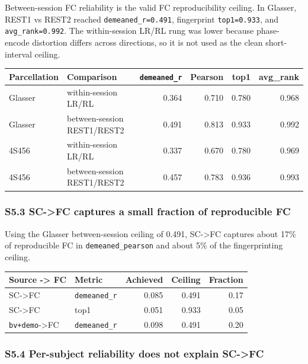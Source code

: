 Between-session FC reliability is the valid FC reproducibility ceiling. In Glasser, REST1 vs REST2 reached \texttt{demeaned\_r=0.491}, fingerprint \texttt{top1=0.933}, and \texttt{avg\_rank=0.992}. The within-session LR/RL rung was lower because phase-encode distortion differs across directions, so it is not used as the clean short-interval ceiling.

{\def\LTcaptype{none} %
\begin{longtable}[]{@{}llrrrr@{}}
\toprule\noalign{}
Parcellation & Comparison & \texttt{demeaned\_r} & Pearson & top1 & avg\_rank \\
\midrule\noalign{}
\endhead
\bottomrule\noalign{}
\endlastfoot
Glasser & within-session LR/RL & 0.364 & 0.710 & 0.780 & 0.968 \\
Glasser & between-session REST1/REST2 & 0.491 & 0.813 & 0.933 & 0.992 \\
4S456 & within-session LR/RL & 0.337 & 0.670 & 0.780 & 0.969 \\
4S456 & between-session REST1/REST2 & 0.457 & 0.783 & 0.936 & 0.993 \\
\end{longtable}
}

\subsubsection{S5.3 SC-\textgreater FC captures a small fraction of reproducible FC}\label{s53-sc-fc-captures-a-small-fraction-of-reproducible-fc}

Using the Glasser between-session ceiling of 0.491, SC-\textgreater FC captures about 17\% of reproducible FC in \texttt{demeaned\_pearson} and about 5\% of the fingerprinting ceiling.

{\def\LTcaptype{none} %
\begin{longtable}[]{@{}llrrr@{}}
\toprule\noalign{}
Source -\textgreater{} FC & Metric & Achieved & Ceiling & Fraction \\
\midrule\noalign{}
\endhead
\bottomrule\noalign{}
\endlastfoot
SC-\textgreater FC & \texttt{demeaned\_r} & 0.085 & 0.491 & 0.17 \\
SC-\textgreater FC & top1 & 0.051 & 0.933 & 0.05 \\
\texttt{bv+demo}-\textgreater FC & \texttt{demeaned\_r} & 0.098 & 0.491 & 0.20 \\
\end{longtable}
}

\subsubsection{S5.4 Per-subject reliability does not explain SC-\textgreater FC}\label{s54-per-subject-reliability-does-not-explain-sc-fc}


